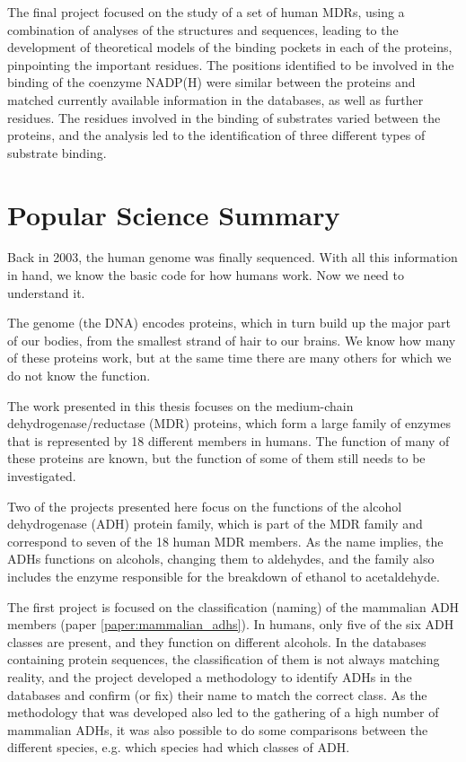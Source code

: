 \documentclass[a4paper, twoside, 12pt, openright]{report}
\begin{document}
The final project focused on the study of a set of human MDRs, using a combination of analyses of the structures and sequences, leading to the development of theoretical models of the binding pockets in each of the proteins, pinpointing the important residues. The positions identified to be involved in the binding of the coenzyme NADP(H) were similar between the proteins and matched currently available information in the databases, as well as further residues. The residues involved in the binding of substrates varied between the proteins, and the analysis led to the identification of three different types of substrate binding.

\thispagestyle{empty}


\chapter*{Popular Science Summary}

Back in 2003, the human genome was finally sequenced. With all this information in hand, we know the basic code for how humans work. Now we need to understand it.

The genome (the DNA) encodes proteins, which in turn build up the major part of our bodies, from the smallest strand of hair to our brains. We know how many of these proteins work, but at the same time there are many others for which we do not know the function.

The work presented in this thesis focuses on the medium-chain dehydrogenase/reductase (MDR) proteins, which form a large family of enzymes that is represented by 18 different members in humans. The function of many of these proteins are known, but the function of some of them still needs to be investigated.

Two of the projects presented here focus on the functions of the alcohol dehydrogenase (ADH) protein family, which is part of the MDR family and correspond to seven of the 18 human MDR members. As the name implies, the ADHs functions on alcohols, changing them to aldehydes, and the family also includes the enzyme responsible for the breakdown of ethanol to acetaldehyde.

The first project is focused on the classification (naming) of the mammalian ADH members (paper \ref{paper:mammalian_adhs}). In humans, only five of the six ADH classes are present, and they function on different alcohols. In the databases containing protein sequences, the classification of them is not always matching reality, and the project developed a methodology to identify ADHs in the databases and confirm (or fix) their name to match the correct class. As the methodology that was developed also led to the gathering of a high number of mammalian ADHs, it was also possible to do some comparisons between the different species, e.g. which species had which classes of ADH.
\end{document}
